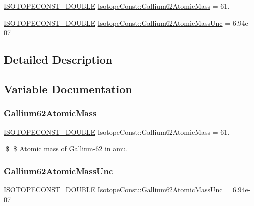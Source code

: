 \begin{DoxyCompactItemize}
\item 
\mbox{\hyperlink{group___isotope_const-_macros_ga8f45a7272ce02c0b4c65c44636ed719a}{I\+S\+O\+T\+O\+P\+E\+C\+O\+N\+S\+T\+\_\+\+D\+O\+U\+B\+LE}} \mbox{\hyperlink{group___isotope_const-_gallium-_ga62_ga2dd4b4abbbdf94a7127531e483ac6d08}{Isotope\+Const\+::\+Gallium62\+Atomic\+Mass}} = 61.
\item 
\mbox{\hyperlink{group___isotope_const-_macros_ga8f45a7272ce02c0b4c65c44636ed719a}{I\+S\+O\+T\+O\+P\+E\+C\+O\+N\+S\+T\+\_\+\+D\+O\+U\+B\+LE}} \mbox{\hyperlink{group___isotope_const-_gallium-_ga62_ga1347d6826ecef2ce3d155d850a3cbd6d}{Isotope\+Const\+::\+Gallium62\+Atomic\+Mass\+Unc}} = 6.\+94e-\/07
\end{DoxyCompactItemize}


\subsection{Detailed Description}


\subsection{Variable Documentation}
\mbox{\label{group___isotope_const-_gallium-_ga62_ga2dd4b4abbbdf94a7127531e483ac6d08}} 
\subsubsection{\texorpdfstring{Gallium62\+Atomic\+Mass}{Gallium62AtomicMass}}
{\footnotesize\ttfamily \mbox{\hyperlink{group___isotope_const-_macros_ga8f45a7272ce02c0b4c65c44636ed719a}{I\+S\+O\+T\+O\+P\+E\+C\+O\+N\+S\+T\+\_\+\+D\+O\+U\+B\+LE}} Isotope\+Const\+::\+Gallium62\+Atomic\+Mass = 61.}

\$ \$ Atomic mass of Gallium-\/62 in amu. \mbox{\label{group___isotope_const-_gallium-_ga62_ga1347d6826ecef2ce3d155d850a3cbd6d}} 
\subsubsection{\texorpdfstring{Gallium62\+Atomic\+Mass\+Unc}{Gallium62AtomicMassUnc}}
{\footnotesize\ttfamily \mbox{\hyperlink{group___isotope_const-_macros_ga8f45a7272ce02c0b4c65c44636ed719a}{I\+S\+O\+T\+O\+P\+E\+C\+O\+N\+S\+T\+\_\+\+D\+O\+U\+B\+LE}} Isotope\+Const\+::\+Gallium62\+Atomic\+Mass\+Unc = 6.\+94e-\/07}

